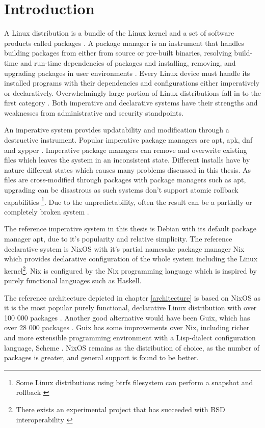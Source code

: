 \chapter{Introduction} \label{johdanto}

A Linux distribution is a bundle of the Linux kernel and a set of
software products called packages \cite{gnuPackagesx2014}. A package
manager is an instrument that handles building packages from either
from source or pre-built binaries, resolving build-time and run-time
dependencies of packages and installing, removing, and upgrading
packages in user environments \cite{gnuPackagesx2014}. Every Linux
device must handle its installed programs with their dependencies and
configurations either imperatively or declaratively. Overwhelmingly
large portion of Linux distributions fall in to the first category
\cite{dolstra2008nixos}. Both imperative and declarative systems have
their strengths and weaknesses from administrative and security
standpoints.

An imperative system provides updatability and modification through a
destructive instrument. Popular imperative package managers are apt,
apk, dnf and zypper \cite{dolstra2008nixos}. Imperative package
managers can remove and overwrite existing files which leaves the
system in an inconsistent state. Different installs have by nature
different states which causes many problems discussed in this
thesis. As files are cross-modified through packages with package
managers such as apt, upgrading can be disastrous as such systems
don't support atomic rollback capabilities \footnote{Some Linux
distributions using btrfs filesystem can perform a snapshot and
rollback \cite{opensuseSystemRecovery}}. Due to the unpredictability,
often the result can be a partially or completely broken system
\cite{dolstra2008nixos}.

The reference imperative system in this thesis is Debian with its
default package manager apt, due to it's popularity and relative
simplicity. The reference declarative system is
NixOS with it's partial namesake package manager Nix which provides declarative
configuration of the whole system including the Linux
kernel\footnote{There exists an experimental project that has
succeeded with BSD interoperability \cite{githubGitHubNixosbsdnixbsd}}. Nix is configured by the Nix
programming language which is inspired by purely functional languages
such as Haskell. \cite{van2013reference}

The reference architecture depicted in chapter \ref{architecture} is
based on NixOS as it is the most popular purely functional,
declarative Linux distribution with over 100 000 packages
\cite{nixosNixOSSearch}. Another good alternative would have been
Guix, which has over 28 000 packages \cite{gnuPackagesx2014}. Guix has
some improvements over Nix, including richer and more extensible
programming environment with a Lisp-dialect configuration language,
Scheme \cite{courtes2021deploiements}. NixOS remains as the
distribution of choice, as the number of packages is greater, and
general support is found to be better.

